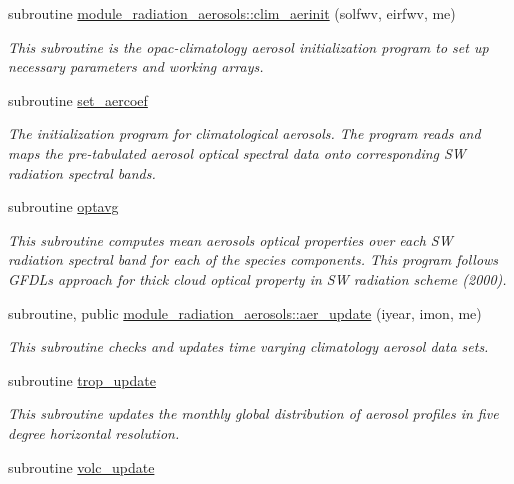 \begin{DoxyCompactItemize}
subroutine \hyperlink{group__module__radiation__aerosols_gacdc24d7d4c01b97920ef940cc01c9cc0}{module\+\_\+radiation\+\_\+aerosols\+::clim\+\_\+aerinit} (solfwv, eirfwv, me)
\begin{DoxyCompactList}\small\item\em This subroutine is the opac-\/climatology aerosol initialization program to set up necessary parameters and working arrays. \end{DoxyCompactList}\item 
subroutine \hyperlink{group__module__radiation__aerosols_ga95fabbc4272ae70f3b345f9b1a898d46}{set\+\_\+aercoef}
\begin{DoxyCompactList}\small\item\em The initialization program for climatological aerosols. The program reads and maps the pre-\/tabulated aerosol optical spectral data onto corresponding SW radiation spectral bands. \end{DoxyCompactList}\item 
subroutine \hyperlink{group__module__radiation__aerosols_ga637761b6110739f2d96322e2ddcc1291}{optavg}
\begin{DoxyCompactList}\small\item\em This subroutine computes mean aerosols optical properties over each SW radiation spectral band for each of the species components. This program follows G\+F\+DL\textquotesingle{}s approach for thick cloud optical property in SW radiation scheme (2000). \end{DoxyCompactList}\item 
subroutine, public \hyperlink{group__module__radiation__aerosols_ga237071d2a0691d5aae199937d9b6aca5}{module\+\_\+radiation\+\_\+aerosols\+::aer\+\_\+update} (iyear, imon, me)
\begin{DoxyCompactList}\small\item\em This subroutine checks and updates time varying climatology aerosol data sets. \end{DoxyCompactList}\item 
subroutine \hyperlink{group__module__radiation__aerosols_gafac9a9c603c033c8511e8dbfe984f703}{trop\+\_\+update}
\begin{DoxyCompactList}\small\item\em This subroutine updates the monthly global distribution of aerosol profiles in five degree horizontal resolution. \end{DoxyCompactList}\item 
subroutine \hyperlink{group__module__radiation__aerosols_ga6ec9bd68d45a5f2c6bb9997bdad420c3}{volc\+\_\+update}

\end{DoxyCompactItemize}
